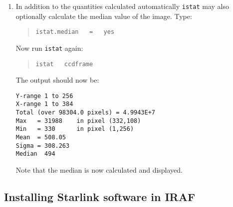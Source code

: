 \documentclass[twoside,11pt]{article}
\begin{document}
\begin{enumerate}
   The output should be something like:

  \newpage
  \begin{verbatim}
        image = ""              (IMage) Name of image to examine
       ystart =                 *! (YStart) First Y value to be used
         yend =                 *! (YEnd) Last Y value to be used
       xstart =                 *! (XStart) First X value to be used
         xend =                 *! (XEnd) Last X value to be used
       (pass2 = no)             (PAss2) Pass twice through data for better sigm
      (median = no)             (MEDian) Calculate median as well as other stat
  (stat_total = 0.)
    (stat_max = 0.)
    (stat_min = 0.)
   (stat_mean = 0.)
  (stat_sigma = 0.)
   (stat_size = 0.)
   (stat_xmax = 0.)
   (stat_xmin = 0.)
   (stat_ymax = 0.)
   (stat_ymin = 0.)
 (stat_xstart = 0.)
   (stat_xend = 0.)
 (stat_ystart = 0.)
   (stat_yend = 0.)
 (stat_median = 0.)
        (mode = "ql")
  \end{verbatim}

  \item In addition to the quantities calculated automatically {\tt istat}
   may also optionally calculate the median value of the image.  Type:

  \begin{quote}
   {\tt istat.median ~ = ~ yes}
  \end{quote}

   Now run {\tt istat} again:

  \begin{quote}
   {\tt istat ~ ccdframe}
  \end{quote}

   The output should now be:

  \begin{verbatim}
Y-range 1 to 256
X-range 1 to 384
Total (over 98304.0 pixels) = 4.9943E+7
Max   = 31988    in pixel (332,108)
Min   = 330      in pixel (1,256)
Mean  = 508.05
Sigma = 308.263
Median  494
  \end{verbatim}

   Note that the median is now calculated and displayed.

\end{enumerate}

\subsection{\label{STARINSTALL}Installing Starlink software in IRAF}
\end{document}
